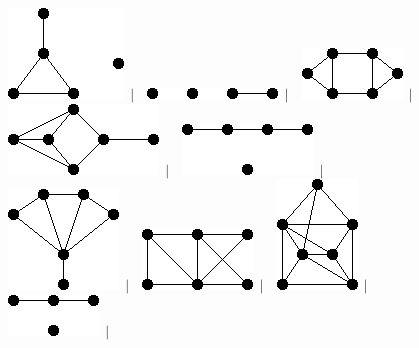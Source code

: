 \documentclass[11pt,paper=b5,footinclude,headinclude]{scrbook} %
\newtheorem{ex}{Vaja\hypertarget{sol:\theex}}[chapter]
\begin{document}
\begin{ex}
\begin{figure}
\includegraphics[scale=0.5]{smallGraphs/g_co-dart.png}$\,\mid\,$\
\includegraphics[scale=0.5]{smallGraphs/g_co-diamond.png}$\,\mid\,$\
\includegraphics[scale=0.5]{smallGraphs/g_co-domino.png}$\,\mid\,$\
\includegraphics[scale=0.5]{smallGraphs/g_co-fish.png}$\,\mid\,$\
\includegraphics[scale=0.5]{smallGraphs/g_co-gem.png}$\,\mid\,$\
\includegraphics[scale=0.5]{smallGraphs/g_co-gemUK1.png}$\,\mid\,$\
\includegraphics[scale=0.5]{smallGraphs/g_co-kiteUK1.png}$\,\mid\,$\
\includegraphics[scale=0.5]{smallGraphs/g_co-longhorn.png}$\,\mid\,$\
\includegraphics[scale=0.5]{smallGraphs/g_co-paw.png}$\,\mid\,$\

\end{figure}
\end{ex}
\end{document}
